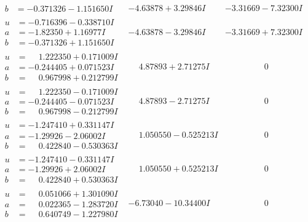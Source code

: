 \documentclass[1p]{elsarticle_modified}
\theoremstyle{definition}
\begin{document}
$$\begin{array}{c|c|c}
\begin{aligned}
b &= -0.371326 - 1.151650 I\end{aligned}
 & -4.63878 + 3.29846 I & -3.31669 - 7.32300 I \\ \hline\begin{aligned}
u &= -0.716396 - 0.338710 I \\
a &= -1.82350 + 1.16977 I \\
b &= -0.371326 + 1.151650 I\end{aligned}
 & -4.63878 - 3.29846 I & -3.31669 + 7.32300 I \\ \hline\begin{aligned}
u &= \phantom{-}1.222350 + 0.171009 I \\
a &= -0.244405 + 0.071523 I \\
b &= \phantom{-}0.967998 + 0.212799 I\end{aligned}
 & \phantom{-}4.87893 + 2.71275 I & \phantom{-0.000000 } 0 \\ \hline\begin{aligned}
u &= \phantom{-}1.222350 - 0.171009 I \\
a &= -0.244405 - 0.071523 I \\
b &= \phantom{-}0.967998 - 0.212799 I\end{aligned}
 & \phantom{-}4.87893 - 2.71275 I & \phantom{-0.000000 } 0 \\ \hline\begin{aligned}
u &= -1.247410 + 0.331147 I \\
a &= -1.29926 - 2.06002 I \\
b &= \phantom{-}0.422840 - 0.530363 I\end{aligned}
 & \phantom{-}1.050550 - 0.525213 I & \phantom{-0.000000 } 0 \\ \hline\begin{aligned}
u &= -1.247410 - 0.331147 I \\
a &= -1.29926 + 2.06002 I \\
b &= \phantom{-}0.422840 + 0.530363 I\end{aligned}
 & \phantom{-}1.050550 + 0.525213 I & \phantom{-0.000000 } 0 \\ \hline\begin{aligned}
u &= \phantom{-}0.051066 + 1.301090 I \\
a &= \phantom{-}0.022365 - 1.283720 I \\
b &= \phantom{-}0.640749 - 1.227980 I\end{aligned}
 & -6.73040 - 10.34400 I & \phantom{-0.000000 } 0 \\ \hline\begin{aligned}

\end{aligned}
\end{array}$$
\end{document}
